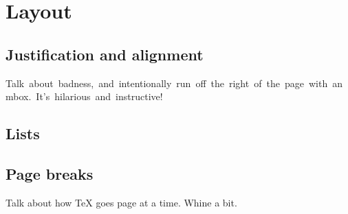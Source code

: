 \chapter{Layout}

\section{Justification and alignment}

\mbox{Talk about badness, and intentionally run off the right of the page with an mbox.
It's hilarious and instructive!}

\section{Lists}

\section{Page breaks}

Talk about how \TeX{} goes page at a time.
Whine a bit.
